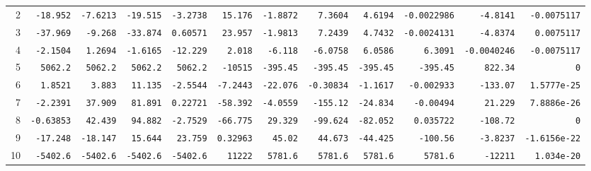 \begin{landscape}
\begin{tabular}{rrrrrrrrrrrr}
2 & \texttt{-18.952} & \texttt{-7.6213} & \texttt{-19.515} & \texttt{-3.2738} & \texttt{15.176} & \texttt{-1.8872} & \texttt{7.3604} & \texttt{4.6194} & \texttt{-0.0022986} & \texttt{-4.8141} & \texttt{-0.0075117} \\

3 & \texttt{-37.969} & \texttt{-9.268} & \texttt{-33.874} & \texttt{0.60571} & \texttt{23.957} & \texttt{-1.9813} & \texttt{7.2439} & \texttt{4.7432} & \texttt{-0.0024131} & \texttt{-4.8374} & \texttt{0.0075117} \\

4 & \texttt{-2.1504} & \texttt{1.2694} & \texttt{-1.6165} & \texttt{-12.229} & \texttt{2.018} & \texttt{-6.118} & \texttt{-6.0758} & \texttt{6.0586} & \texttt{6.3091} & \texttt{-0.0040246} & \texttt{-0.0075117} \\

5 & \texttt{5062.2} & \texttt{5062.2} & \texttt{5062.2} & \texttt{5062.2} & \texttt{-10515} & \texttt{-395.45} & \texttt{-395.45} & \texttt{-395.45} & \texttt{-395.45} & \texttt{822.34} & \texttt{0} \\

6 & \texttt{1.8521} & \texttt{3.883} & \texttt{11.135} & \texttt{-2.5544} & \texttt{-7.2443} & \texttt{-22.076} & \texttt{-0.30834} & \texttt{-1.1617} & \texttt{-0.002933} & \texttt{-133.07} & \texttt{1.5777e-25} \\

7 & \texttt{-2.2391} & \texttt{37.909} & \texttt{81.891} & \texttt{0.22721} & \texttt{-58.392} & \texttt{-4.0559} & \texttt{-155.12} & \texttt{-24.834} & \texttt{-0.00494} & \texttt{21.229} & \texttt{7.8886e-26} \\

8 & \texttt{-0.63853} & \texttt{42.439} & \texttt{94.882} & \texttt{-2.7529} & \texttt{-66.775} & \texttt{29.329} & \texttt{-99.624} & \texttt{-82.052} & \texttt{0.035722} & \texttt{-108.72} & \texttt{0} \\

9 & \texttt{-17.248} & \texttt{-18.147} & \texttt{15.644} & \texttt{23.759} & \texttt{0.32963} & \texttt{45.02} & \texttt{44.673} & \texttt{-44.425} & \texttt{-100.56} & \texttt{-3.8237} & \texttt{-1.6156e-22} \\

10 & \texttt{-5402.6} & \texttt{-5402.6} & \texttt{-5402.6} & \texttt{-5402.6} & \texttt{11222} & \texttt{5781.6} & \texttt{5781.6} & \texttt{5781.6} & \texttt{5781.6} & \texttt{-12211} & \texttt{1.034e-20} \\


\end{tabular}
\end{landscape}
